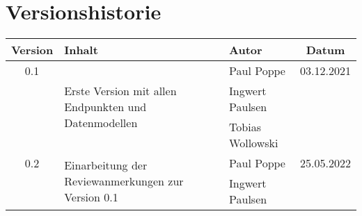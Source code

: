 \chapter*{Versionshistorie}
\begin{table}[htb]
	\begin{tabularx}{\textwidth}{|c|X|l|c|}
		\hline
\textbf{Version} & \textbf{Inhalt} & \textbf{Autor} & \textbf{Datum} \\ \hline
0.1 & \multirow[t]{3}{=}{Erste Version mit allen Endpunkten und Datenmodellen} & Paul Poppe & 03.12.2021 \\
 & & Ingwert Paulsen &  \\
 & & Tobias Wollowski &  \\ \hline
0.2 & \multirow[t]{3}{=}{Einarbeitung der Reviewanmerkungen zur Version 0.1} & Paul Poppe & 25.05.2022 \\
 & & Ingwert Paulsen &  \\ \hline
	\end{tabularx}
\end{table}
